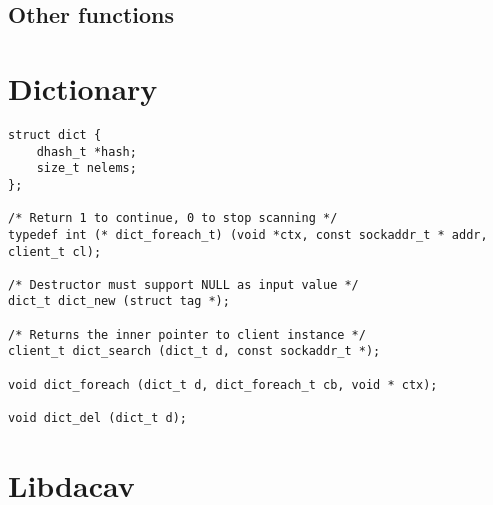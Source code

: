 \subsection{Other functions}
\label{nh-oth-func}

\section{Dictionary}
\begin{lstlisting}
struct dict {
    dhash_t *hash;
    size_t nelems;
};

/* Return 1 to continue, 0 to stop scanning */
typedef int (* dict_foreach_t) (void *ctx, const sockaddr_t * addr,
client_t cl);

/* Destructor must support NULL as input value */
dict_t dict_new (struct tag *);

/* Returns the inner pointer to client instance */
client_t dict_search (dict_t d, const sockaddr_t *);

void dict_foreach (dict_t d, dict_foreach_t cb, void * ctx);

void dict_del (dict_t d);

\end{lstlisting}


\section{Libdacav}
